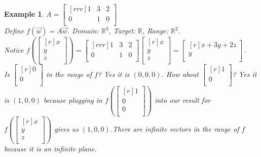 \documentclass{report}
\newtheorem*{ex}{Example}
\begin{document}
\begin{ex}
$A = \begin{bmatrix}[rrr] 1&3&2\\0&1&0\\ \end{bmatrix}$\\
Define $f(\vec{w}) = A\vec{w}$. Domain: $\mathbb{R}^3$, Target: $\mathbb{R}$, Range: $\mathbb{R}^2$.\\

Notice $f(\begin{bmatrix}[r]x\\y\\z\\ \end{bmatrix}) = \begin{bmatrix}[rrr]1&3&2\\0&1&0\\ \end{bmatrix}\begin{bmatrix}[r]x\\y\\z\\ \end{bmatrix} = \begin{bmatrix}[r]x+3y+2z\\y\\ \end{bmatrix}$.\\
Is $\begin{bmatrix}[r]0\\0\\\end{bmatrix}$ in the range of $f$? Yes it is $(0,0,0)$. How about $\begin{bmatrix}[r]1\\0\\\end{bmatrix}$? Yes it is $(1,0,0)$ because plugging in $f(\begin{bmatrix}[r]1\\0\\0\\\end{bmatrix})$ into our result for $f(\begin{bmatrix}[r]x\\y\\z\\\end{bmatrix})$ gives us $(1,0,0)$.There are infinite vectors in the range of $f$ because it is an infinite plane. 
\end{ex}
\end{document}
